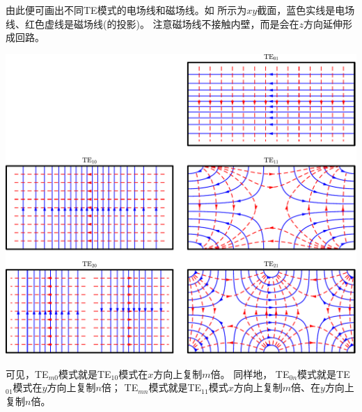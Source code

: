 由此便可画出不同TE模式的电场线和磁场线。如 所示为$xy$截面，蓝色实线是电场线、红色虚线是磁场线(的投影)。
注意磁场线不接触内壁，而是会在$z$方向延伸形成回路。
\begin{center}
    \includegraphics[width=0.8\linewidth]{graphs/waveguide_rect_TE.pdf}
    \label{fig:waveguide rect TE}
\end{center}
可见，TE$_{m0}$模式就是TE$_{10}$模式在$x$方向上复制$m$倍。
同样地，
TE$_{0n}$模式就是TE$_{01}$模式在$y$方向上复制$n$倍；
TE$_{mn}$模式就是TE$_{11}$模式$x$方向上复制$m$倍、在$y$方向上复制$n$倍。

